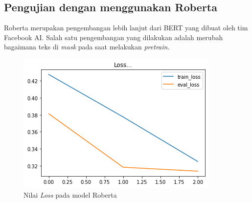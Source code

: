 \subsection{Pengujian dengan menggunakan Roberta}

Roberta merupakan pengembangan lebih lanjut dari BERT yang dibuat oleh tim Facebook AI. Salah satu pengembangan yang dilakukan adalah merubah bagaimana teks di \textit{mask} pada saat melakukan \textit{pretrain}.

\begin{figure}[h]
    \begin{center}
        \includegraphics[width= 0.9\linewidth]{gambar/loss_roberta522.png}
        \caption{Nilai \textit{Loss} pada model Roberta}
        \label{fig: loss_roberta}
    \end{center}
\end{figure}

